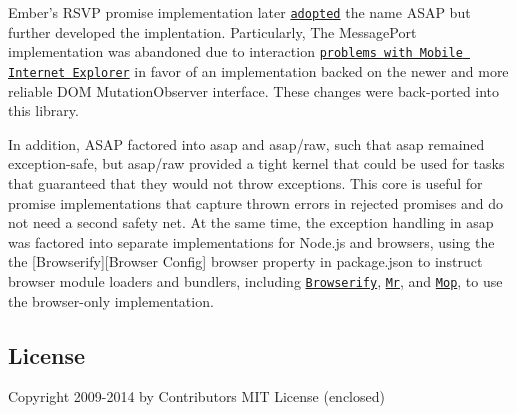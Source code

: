 Ember’s R\+S\+VP promise implementation later \href{https://github.com/tildeio/rsvp.js/blob/cddf7232546a9cf858524b75cde6f9edf72620a7/lib/rsvp/asap.js}{\tt adopted} the name A\+S\+AP but further developed the implentation. Particularly, The {\ttfamily Message\+Port} implementation was abandoned due to interaction \href{https://github.com/cujojs/when/issues/197}{\tt problems with Mobile Internet Explorer} in favor of an implementation backed on the newer and more reliable D\+OM {\ttfamily Mutation\+Observer} interface. These changes were back-\/ported into this library.

In addition, A\+S\+AP factored into {\ttfamily asap} and {\ttfamily asap/raw}, such that {\ttfamily asap} remained exception-\/safe, but {\ttfamily asap/raw} provided a tight kernel that could be used for tasks that guaranteed that they would not throw exceptions. This core is useful for promise implementations that capture thrown errors in rejected promises and do not need a second safety net. At the same time, the exception handling in {\ttfamily asap} was factored into separate implementations for Node.\+js and browsers, using the the \mbox{[}Browserify\mbox{]}\mbox{[}Browser Config\mbox{]} {\ttfamily browser} property in {\ttfamily package.\+json} to instruct browser module loaders and bundlers, including \href{https://github.com/substack/node-browserify}{\tt Browserify}, \href{https://github.com/montagejs/mr}{\tt Mr}, and \href{https://github.com/montagejs/mop}{\tt Mop}, to use the browser-\/only implementation.

\subsection*{License}

Copyright 2009-\/2014 by Contributors M\+IT License (enclosed) 